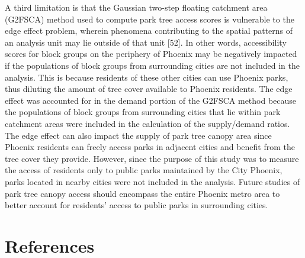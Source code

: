 \documentclass[
  sn-basic,
]{sn-jnl}
\begin{document}
A third limitation is that the Gaussian two-step floating catchment area
(G2FSCA) method used to compute park tree access scores is vulnerable to
the edge effect problem, wherein phenomena contributing to the spatial
patterns of an analysis unit may lie outside of that unit {[}52{]}. In
other words, accessibility scores for block groups on the periphery of
Phoenix may be negatively impacted if the populations of block groups
from surrounding cities are not included in the analysis. This is
because residents of these other cities can use Phoenix parks, thus
diluting the amount of tree cover available to Phoenix residents. The
edge effect was accounted for in the demand portion of the G2FSCA method
because the populations of block groups from surrounding cities that lie
within park catchment areas were included in the calculation of the
supply/demand ratios. The edge effect can also impact the supply of park
tree canopy area since Phoenix residents can freely access parks in
adjacent cities and benefit from the tree cover they provide. However,
since the purpose of this study was to measure the access of residents
only to public parks maintained by the City Phoenix, parks located in
nearby cities were not included in the analysis. Future studies of park
tree canopy access should encompass the entire Phoenix metro area to
better account for residents' access to public parks in surrounding
cities.

\section*{References}\label{references}
\end{document}
